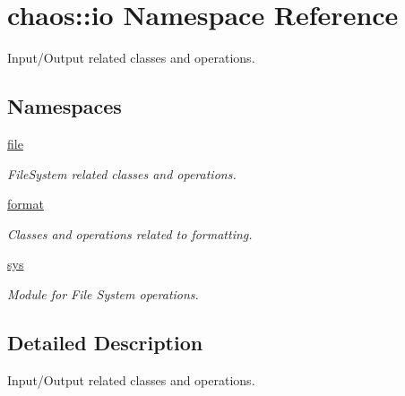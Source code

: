 \hypertarget{namespacechaos_1_1io}{\section{chaos\-:\-:io Namespace Reference}
\label{namespacechaos_1_1io}
}


Input/\-Output related classes and operations.  


\subsection*{Namespaces}
\begin{DoxyCompactItemize}
\item 
\hyperlink{namespacechaos_1_1io_1_1file}{file}
\begin{DoxyCompactList}\small\item\em File\-System related classes and operations. \end{DoxyCompactList}\item 
\hyperlink{namespacechaos_1_1io_1_1format}{format}
\begin{DoxyCompactList}\small\item\em Classes and operations related to formatting. \end{DoxyCompactList}\item 
\hyperlink{namespacechaos_1_1io_1_1sys}{sys}
\begin{DoxyCompactList}\small\item\em Module for File System operations. \end{DoxyCompactList}\end{DoxyCompactItemize}


\subsection{Detailed Description}
Input/\-Output related classes and operations. 